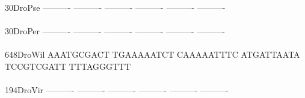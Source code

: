 \documentclass[11pt,twoside,reqno,a4paper]{article}
\begin{document}
{30\hspace*{3\charwidth}DroPse	----------	----------	----------	----------	----------	----------	\\
\hspace*{5\charwidth}\hspace*{7\charwidth}\hspace*{1\charwidth}\hspace*{1\charwidth}\hspace*{1\charwidth}\hspace*{1\charwidth}\hspace*{1\charwidth}\hspace*{1\charwidth}\\
30\hspace*{3\charwidth}DroPer	----------	----------	----------	----------	----------	----------	\\
\hspace*{5\charwidth}\hspace*{7\charwidth}\hspace*{1\charwidth}\hspace*{1\charwidth}\hspace*{1\charwidth}\hspace*{1\charwidth}\hspace*{1\charwidth}\hspace*{1\charwidth}\\
648\hspace*{2\charwidth}DroWil	AAATGCGACT	TGAAAAATCT	CAAAAATTTC	ATGATTAATA	TCCGTCGATT	TTTAGGGTTT	\\
\hspace*{5\charwidth}\hspace*{7\charwidth}\hspace*{1\charwidth}\hspace*{1\charwidth}\hspace*{1\charwidth}\hspace*{1\charwidth}\hspace*{1\charwidth}\hspace*{1\charwidth}\\
194\hspace*{2\charwidth}DroVir	----------	----------	----------	----------	----------	----------	\\
\hspace*{5\charwidth}\hspace*{7\charwidth}\hspace*{1\charwidth}\hspace*{1\charwidth}\hspace*{1\charwidth}\hspace*{1\charwidth}\hspace*{1\charwidth}\hspace*{1\charwidth}\\
}
\end{document}
